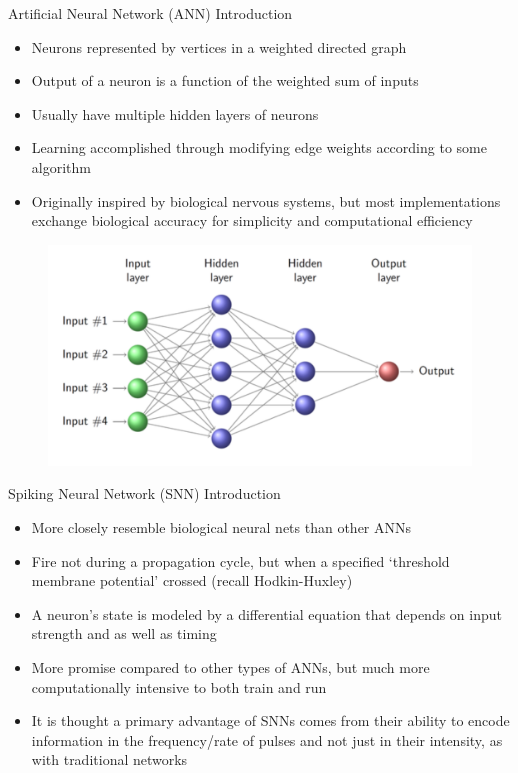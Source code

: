 \documentclass[leqno,presentation,unknownkeysallowed]{beamer}
\begin{document}
\begin{frame}{Artificial Neural Network (ANN) Introduction}
\begin{itemize}
\item Neurons represented by vertices in a weighted directed graph
\item Output of a neuron is a function of the weighted sum of inputs
\item Usually have multiple hidden layers of neurons
\item Learning accomplished through modifying edge weights according to some algorithm
\item Originally inspired by biological nervous systems, but most implementations exchange biological accuracy for simplicity and computational efficiency
\end{itemize}
\begin{figure}
    \centering
    \includegraphics[scale=0.3]{ann.png}
\end{figure}
\end{frame}

\begin{frame}{Spiking Neural Network (SNN) Introduction}
\begin{itemize}
\item More closely resemble biological neural nets than other ANNs
\item Fire not during a propagation cycle, but when a specified `threshold membrane potential' crossed (recall Hodkin-Huxley)
\item A neuron's state is modeled by a differential equation that depends on input strength and as well as timing
\item More promise compared to other types of ANNs, but much more computationally intensive to both train and run
\item It is thought a primary advantage of SNNs comes from their ability to encode information in the frequency/rate of pulses and not just in their intensity, as with traditional networks
\end{itemize}
\end{frame}
\end{document}
